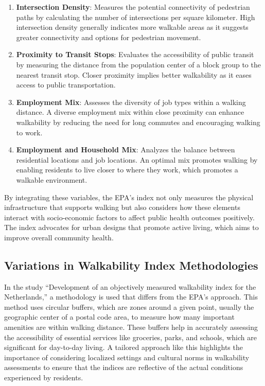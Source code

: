 \documentclass[
]{article}
\begin{document}
\begin{enumerate}
\def\labelenumi{\arabic{enumi}.}
\item
  \textbf{Intersection Density}: Measures the potential connectivity of
  pedestrian paths by calculating the number of intersections per square
  kilometer. High intersection density generally indicates more walkable
  areas as it suggests greater connectivity and options for pedestrian
  movement.
\item
  \textbf{Proximity to Transit Stops}: Evaluates the accessibility of
  public transit by measuring the distance from the population center of
  a block group to the nearest transit stop. Closer proximity implies
  better walkability as it eases access to public transportation.
\item
  \textbf{Employment Mix}: Assesses the diversity of job types within a
  walking distance. A diverse employment mix within close proximity can
  enhance walkability by reducing the need for long commutes and
  encouraging walking to work.
\item
  \textbf{Employment and Household Mix}: Analyzes the balance between
  residential locations and job locations. An optimal mix promotes
  walking by enabling residents to live closer to where they work, which
  promotes a walkable environment.
\end{enumerate}

By integrating these variables, the EPA's index not only measures the
physical infrastructure that supports walking but also considers how
these elements interact with socio-economic factors to affect public
health outcomes positively. The index advocates for urban designs that
promote active living, which aims to improve overall community health.

\subsection{Variations in Walkability Index
Methodologies}\label{variations-in-walkability-index-methodologies}

In the study ``Development of an objectively measured walkability index
for the Netherlands,'' a methodology is used that differs from the EPA's
approach. This method uses circular buffers, which are zones around a
given point, usually the geographic center of a postal code area, to
measure how many important amenities are within walking distance. These
buffers help in accurately assessing the accessibility of essential
services like groceries, parks, and schools, which are significant for
day-to-day living. A tailored approach like this highlights the
importance of considering localized settings and cultural norms in
walkability assessments to ensure that the indices are reflective of the
actual conditions experienced by residents.
\end{document}
